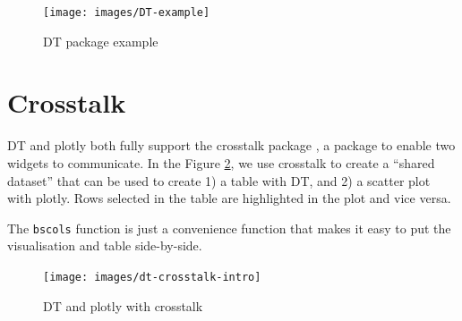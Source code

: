 \documentclass[10pt,]{krantz}
\makeatletter
\newenvironment{Shaded}{\begin{snugshade}}{\end{snugshade}}
\newcommand{\DataTypeTok}[1]{\textcolor[rgb]{0.27,0.27,0.27}{#1}}
\newcommand{\KeywordTok}[1]{\textcolor[rgb]{0.27,0.27,0.27}{\textbf{#1}}}
\newcommand{\NormalTok}[1]{#1}
\newcommand{\OperatorTok}[1]{\textcolor[rgb]{0.43,0.43,0.43}{\textbf{#1}}}
\newcommand{\StringTok}[1]{\textcolor[rgb]{0.5,0.5,0.5}{#1}}
\newenvironment{kframe}{%
\medskip{}
\setlength{\fboxsep}{.8em}
 \def\at@end@of@kframe{}%
 \ifinner\ifhmode%
  \def\at@end@of@kframe{\end{minipage}}%
  \begin{minipage}{\columnwidth}%
 \fi\fi%
 \def\FrameCommand##1{\hskip\@totalleftmargin \hskip-\fboxsep
 \colorbox{shadecolor}{##1}\hskip-\fboxsep
     \hskip-\linewidth \hskip-\@totalleftmargin \hskip\columnwidth}%
 \MakeFramed {\advance\hsize-\width
   \@totalleftmargin\z@ \linewidth\hsize
   \@setminipage}}%
 {\par\unskip\endMakeFramed%
 \at@end@of@kframe}
\renewenvironment{Shaded}{\begin{kframe}}{\end{kframe}}
\makeatother
\begin{document}
\begin{figure}[H]

{\centering \texttt{[image: images/DT-example]} 

}

\caption{DT package example}\label{fig:dt-example}
\end{figure}

\hypertarget{widgets-intro-crosstalk}{%
\section{Crosstalk}\label{widgets-intro-crosstalk}}

DT and plotly both fully support the crosstalk package \citep{R-crosstalk}, a package to enable two widgets to communicate. In the Figure \ref{fig:dt-example-crosstalk}, we use crosstalk to create a ``shared dataset'' that can be used to create 1) a table with DT, and 2) a scatter plot with plotly. Rows selected in the table are highlighted in the plot and vice versa.

The \texttt{bscols} function is just a convenience function that makes it easy to put the visualisation and table side-by-side.

\begin{Shaded}
\end{Shaded}

\begin{figure}[H]

{\centering \texttt{[image: images/dt-crosstalk-intro]} 

}

\caption{DT and plotly with crosstalk}\label{fig:dt-example-crosstalk}
\end{figure}
\end{document}
